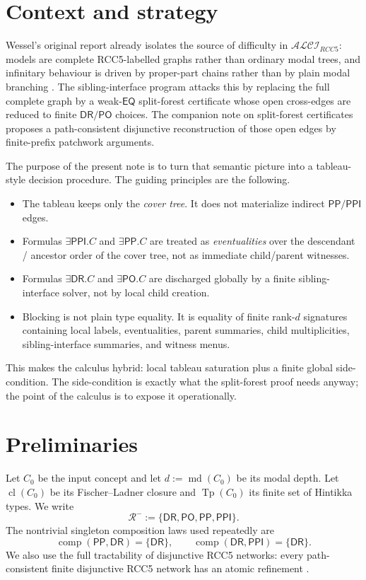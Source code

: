 \documentclass[11pt]{article}
\theoremstyle{remark}
\newcommand{\DR}{\mathsf{DR}}
\newcommand{\PO}{\mathsf{PO}}
\newcommand{\PP}{\mathsf{PP}}
\newcommand{\PPI}{\mathsf{PPI}}
\newcommand{\EQ}{\mathsf{EQ}}
\newcommand{\cl}{\operatorname{cl}}
\newcommand{\Tp}{\operatorname{Tp}}
\newcommand{\md}{\operatorname{md}}
\newcommand{\comp}{\operatorname{comp}}
\begin{document}
\section{Context and strategy}

Wessel's original report already isolates the source of difficulty in $\mathcal{ALCI}_{RCC5}$: models are complete RCC5-labelled graphs rather than ordinary modal trees, and infinitary behaviour is driven by proper-part chains rather than by plain modal branching \cite{Wessel2003}. The sibling-interface program attacks this by replacing the full complete graph by a weak-$\EQ$ split-forest certificate whose open cross-edges are reduced to finite $\DR/\PO$ choices. The companion note on split-forest certificates proposes a path-consistent disjunctive reconstruction of those open edges by finite-prefix patchwork arguments.

The purpose of the present note is to turn that semantic picture into a tableau-style decision procedure. The guiding principles are the following.
\begin{itemize}
    \item The tableau keeps only the \emph{cover tree}. It does not materialize indirect $\PP/\PPI$ edges.
    \item Formulas $\exists\PPI.C$ and $\exists\PP.C$ are treated as \emph{eventualities} over the descendant / ancestor order of the cover tree, not as immediate child/parent witnesses.
    \item Formulas $\exists\DR.C$ and $\exists\PO.C$ are discharged globally by a finite sibling-interface solver, not by local child creation.
    \item Blocking is not plain type equality. It is equality of finite rank-$d$ signatures containing local labels, eventualities, parent summaries, child multiplicities, sibling-interface summaries, and witness menus.
\end{itemize}

This makes the calculus hybrid: local tableau saturation plus a finite global side-condition. The side-condition is exactly what the split-forest proof needs anyway; the point of the calculus is to expose it operationally.

\section{Preliminaries}

Let $C_0$ be the input concept and let $d:=\md(C_0)$ be its modal depth. Let $\cl(C_0)$ be its Fischer--Ladner closure and $\Tp(C_0)$ its finite set of Hintikka types. We write
\[
\mathcal{R}^{-}:=\{\DR,\PO,\PP,\PPI\}.
\]
The nontrivial singleton composition laws used repeatedly are
\[
\comp(\PP,\DR)=\{\DR\},\qquad \comp(\DR,\PPI)=\{\DR\}.
\]
We also use the full tractability of disjunctive RCC5 networks: every path-consistent finite disjunctive RCC5 network has an atomic refinement \cite{Wessel2003,Sibling2026}.
\end{document}
